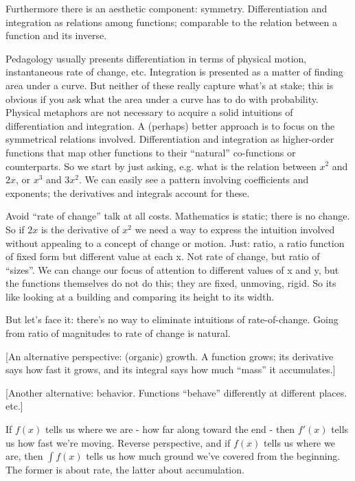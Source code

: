 \begin{remark}
  Furthermore there is an aesthetic component: symmetry.
  Differentiation and integration as relations among functions;
  comparable to the relation between a function and its inverse.

  Pedagology usually presents differentiation in terms of physical
  motion, instantaneous rate of change, etc.  Integration is presented
  as a matter of finding area under a curve.  But neither of these
  really capture what's at stake; this is obvious if you ask what the
  area under a curve has to do with probability.  Physical metaphors
  are not necessary to acquire a solid intuitions of differentiation
  and integration.  A (perhaps) better approach is to focus on the
  symmetrical relations involved.  Differentiation and integration as
  higher-order functions that map other functions to their ``natural''
  co-functions or counterparts.  So we start by just asking, e.g. what
  is the relation between \(x^2\) and \(2x\), or \(x^3\) and \(3x^2\).
  We can easily see a pattern involving coefficients and exponents;
  the derivatives and integrals account for these.

  Avoid ``rate of change'' talk at all costs.  Mathematics is static;
  there is no change.  So if \(2x\) is the derivative of \(x^2\) we
  need a way to express the intuition involved without appealing to a
  concept of change or motion.  Just: ratio, a ratio function of fixed
  form but different value at each x.  Not rate of change, but ratio
  of ``sizes''.  We can change our focus of attention to different
  values of x and y, but the functions themselves do not do this; they
  are fixed, unmoving, rigid.  So its like looking at a building and
  comparing its height to its width.

  But let's face it: there's no way to eliminate intuitions of
  rate-of-change.  Going from ratio of magnitudes to rate of change is
  natural.

  [An alternative perspective: (organic) growth.  A function grows;
    its derivative says how fast it grows, and its integral says how
    much ``mass'' it accumulates.]

  [Another alternative: behavior.  Functions ``behave'' differently at
    different places. etc.]

  If \(f(x)\) tells us where we are - how far along toward the end -
  then \(f'(x)\) tells us how fast we're moving.  Reverse perspective,
  and if \(f(x)\) tells us where we are, then \(\int f(x)\) tells us
  how much ground we've covered from the beginning.  The former is
  about rate, the latter about accumulation.


\end{remark}
